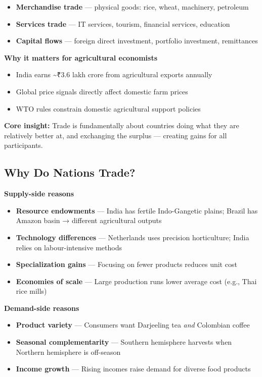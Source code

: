 \documentclass[
  letterpaper,
  DIV=11,
  numbers=noendperiod]{scrartcl}
\providecommand{\tightlist}{%
  \setlength{\itemsep}{0pt}\setlength{\parskip}{0pt}}
\begin{document}
\begin{itemize}
\tightlist
\item
  \textbf{Merchandise trade} --- physical goods: rice, wheat, machinery,
  petroleum
\item
  \textbf{Services trade} --- IT services, tourism, financial services,
  education
\item
  \textbf{Capital flows} --- foreign direct investment, portfolio
  investment, remittances
\end{itemize}

\textbf{Why it matters for agricultural economists}

\begin{itemize}
\tightlist
\item
  India earns \textasciitilde₹3.6 lakh crore from agricultural exports
  annually
\item
  Global price signals directly affect domestic farm prices
\item
  WTO rules constrain domestic agricultural support policies
\end{itemize}

\textbf{Core insight:} Trade is fundamentally about countries doing what
they are relatively better at, and exchanging the surplus --- creating
gains for all participants.

\subsection{Why Do Nations Trade?}\label{why-do-nations-trade}

\textbf{Supply-side reasons}

\begin{itemize}
\tightlist
\item
  \textbf{Resource endowments} --- India has fertile Indo-Gangetic
  plains; Brazil has Amazon basin → different agricultural outputs
\item
  \textbf{Technology differences} --- Netherlands uses precision
  horticulture; India relies on labour-intensive methods
\item
  \textbf{Specialization gains} --- Focusing on fewer products reduces
  unit cost
\item
  \textbf{Economies of scale} --- Large production runs lower average
  cost (e.g., Thai rice mills)
\end{itemize}

\textbf{Demand-side reasons}

\begin{itemize}
\tightlist
\item
  \textbf{Product variety} --- Consumers want Darjeeling tea \emph{and}
  Colombian coffee
\item
  \textbf{Seasonal complementarity} --- Southern hemisphere harvests
  when Northern hemisphere is off-season
\item
  \textbf{Income growth} --- Rising incomes raise demand for diverse
  food products
\end{itemize}
\end{document}
